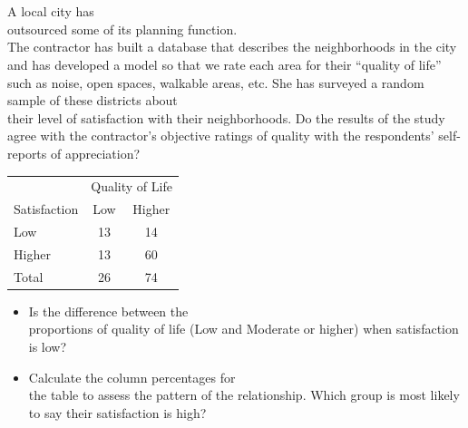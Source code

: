 \documentclass[11pt, chapterprefix=true]{scrbook}\usepackage[]{graphicx}\usepackage[]{color}
\begin{document}
\twocolumn

\section{}

\begin{exercises}
  \begin{exercise}  %

 A local city has \\ outsourced some of its planning function.  \\ The contractor has built a database that describes the neighborhoods in the city and has developed a model so that we rate each area for their ``quality of life'' such as noise, open spaces, walkable areas, etc.  She has surveyed a random sample of these districts about \\ their level of satisfaction with their neighborhoods.   Do the results of the study agree with the contractor's objective ratings of quality with the respondents' self-reports of appreciation?

    \begin{table}[htbp]
   \centering
   \begin{tabular}{@{} lcc @{}} \hline %

    &  \multicolumn{2}{c}{Quality of Life} \\
    Satisfaction       & Low  & Higher  \\ \hline
    Low                & 13 & 14 \\
    Higher             & 13 & 60 \\ \hline
    Total              & 26 & 74 \\ \hline
    \end{tabular}
    \label{tab:c10_9}
  \end{table}

	  \begin{itemize}
	  \item Is the difference between the \\ proportions of quality of life (Low and Moderate or higher) when satisfaction is low?
	  \item Calculate the column percentages for \\ the table to assess the pattern of the relationship.  Which group is most likely to say their satisfaction is high?
	  \end{itemize}
	  \vspace{5mm}


\end{exercise}
\end{exercises}
\end{document}
